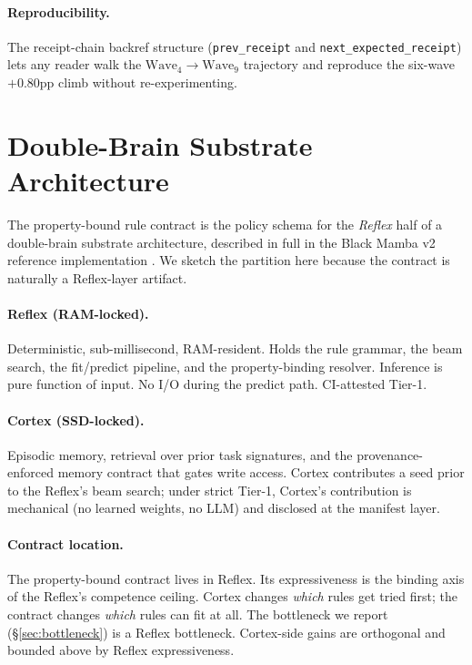\documentclass[11pt]{article}
\begin{document}
\paragraph{Reproducibility.}
The receipt-chain backref structure (\texttt{prev\_receipt} and
\texttt{next\_expected\_receipt}) lets any reader walk the
$\mathrm{Wave}_4 \to \mathrm{Wave}_9$ trajectory and reproduce the
six-wave $+0.80$pp climb without re-experimenting.

\section{Double-Brain Substrate Architecture}
\label{sec:doublebrain}

The property-bound rule contract is the policy schema for the
\emph{Reflex} half of a double-brain substrate architecture, described
in full in the Black Mamba v2 reference implementation
\cite{blackmamba}. We sketch the partition here because the contract is
naturally a Reflex-layer artifact.

\paragraph{Reflex (RAM-locked).}
Deterministic, sub-millisecond, RAM-resident. Holds the rule grammar,
the beam search, the fit/predict pipeline, and the property-binding
resolver. Inference is pure function of input. No I/O during the
predict path. CI-attested Tier-1.

\paragraph{Cortex (SSD-locked).}
Episodic memory, retrieval over prior task signatures, and the
provenance-enforced memory contract that gates write access. Cortex
contributes a seed prior to the Reflex's beam search; under strict
Tier-1, Cortex's contribution is mechanical (no learned weights,
no LLM) and disclosed at the manifest layer.

\paragraph{Contract location.}
The property-bound contract lives in Reflex. Its expressiveness is
the binding axis of the Reflex's competence ceiling. Cortex changes
\emph{which} rules get tried first; the contract changes \emph{which}
rules can fit at all. The bottleneck we report
(\S\ref{sec:bottleneck}) is a Reflex bottleneck. Cortex-side gains
are orthogonal and bounded above by Reflex expressiveness.
\end{document}
